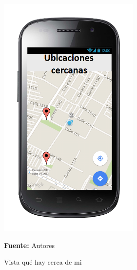 \begin{figure}[!htb]
  \begin{center}
\includegraphics[width=7cm]{./imagenes/UI/Ubicacion/que_hay_cerca_de_mi.png}
    \caption{Vista qué hay cerca de mi}
    \label{fig:Vista_que_hay_cerca_de_mi}
    \textbf{Fuente:}  Autores
  \end{center}
\end{figure}

